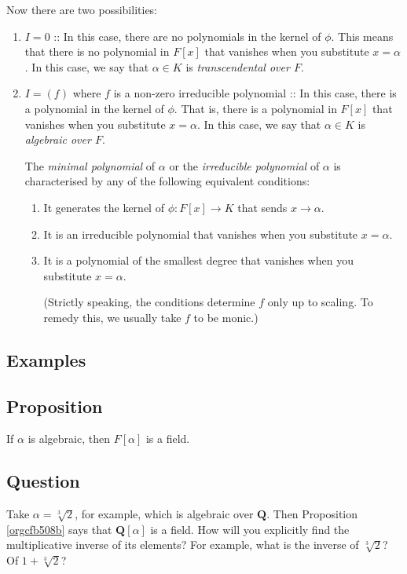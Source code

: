 \documentclass[11pt]{article}
\begin{document}
Now there are two possibilities: 
\begin{enumerate}
\item \(I = 0\) :: In this case, there are no polynomials in the kernel of \(\phi\).
This means that there is no polynomial in \(F[x]\) that vanishes when you substitute \(x = \alpha\).
In this case, we say that \(\alpha \in K\) is \emph{transcendental over \(F\)}.
\item \(I = (f)\) where \(f\) is a non-zero irreducible polynomial :: In this case, there is a polynomial in the kernel of \(\phi\).
That is, there is a polynomial in \(F[x]\) that vanishes when you substitute \(x = \alpha.\)
In this case, we say that \(\alpha \in K\) is \emph{algebraic over \(F\)}.

The \emph{minimal polynomial} of \(\alpha\) or the \emph{irreducible polynomial} of \(\alpha\) is characterised by any of the following equivalent conditions:

\begin{enumerate}
\item It generates the kernel of \(\phi \colon F[x] \to K\) that sends \(x \to \alpha\).

\item It is an irreducible polynomial that vanishes when you substitute \(x = \alpha\).

\item It is a polynomial of the smallest degree that vanishes when you substitute \(x = \alpha\).

(Strictly speaking, the conditions determine \(f\) only up to scaling.  To remedy this, we usually take \(f\) to be monic.)
\end{enumerate}
\end{enumerate}
\subsection{Examples}
\label{sec:org1054e62}
\subsection{Proposition}
\label{sec:org65f9909}
\label{orgcfb508b}
If \(\alpha\) is algebraic, then \(F[\alpha]\) is a field.
\subsection{Question}
\label{sec:org318a676}
Take \(\alpha = \sqrt[3]{2}\), for example, which is algebraic over \(\mathbf{Q}\).
Then Proposition \ref{orgcfb508b} says that \(\mathbf{Q}[\alpha]\) is a field.
How will you explicitly find the multiplicative inverse of its elements?
For example, what is the inverse of \(\sqrt[3]{2}\)? Of \(1 + \sqrt[3]{2}\)?
\end{document}
